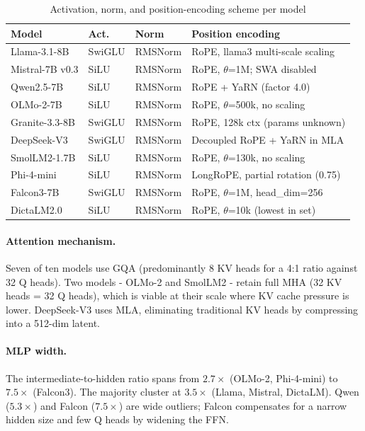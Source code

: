 \documentclass[11pt, a4paper]{article}
\begin{document}
\begin{table}[H]
\centering\small
\caption{Activation, norm, and position-encoding scheme per model}
\label{tab:comparison2}
\begin{tabular}{@{}L{3.0cm}L{1.8cm}L{1.8cm}L{7cm}@{}}
\toprule
\textbf{Model} & \textbf{Act.} & \textbf{Norm} & \textbf{Position encoding} \\
\midrule
Llama-3.1-8B    & SwiGLU & RMSNorm & RoPE, llama3 multi-scale scaling \\
Mistral-7B v0.3 & SiLU   & RMSNorm & RoPE, $\theta$=1M; SWA disabled \\
Qwen2.5-7B      & SiLU   & RMSNorm & RoPE + YaRN (factor 4.0) \\
OLMo-2-7B       & SiLU   & RMSNorm & RoPE, $\theta$=500k, no scaling \\
Granite-3.3-8B  & SwiGLU & RMSNorm & RoPE, 128k ctx (params unknown) \\
DeepSeek-V3     & SwiGLU & RMSNorm & Decoupled RoPE + YaRN in MLA \\
SmolLM2-1.7B    & SiLU   & RMSNorm & RoPE, $\theta$=130k, no scaling \\
Phi-4-mini      & SiLU   & RMSNorm & LongRoPE, partial rotation (0.75) \\
Falcon3-7B      & SwiGLU & RMSNorm & RoPE, $\theta$=1M, head\_dim=256 \\
DictaLM2.0      & SiLU   & RMSNorm & RoPE, $\theta$=10k (lowest in set) \\
\bottomrule
\end{tabular}
\end{table}

\paragraph{Attention mechanism.}
Seven of ten models use GQA (predominantly 8 KV heads for a 4:1 ratio against 32
Q heads).
Two models - OLMo-2 and SmolLM2 - retain full MHA (32 KV heads = 32 Q heads),
which is viable at their scale where KV cache pressure is lower.
DeepSeek-V3 uses MLA, eliminating traditional KV heads by compressing into a
512-dim latent.

\paragraph{MLP width.}
The intermediate-to-hidden ratio spans from $2.7\times$ (OLMo-2, Phi-4-mini)
to $7.5\times$ (Falcon3).
The majority cluster at $3.5\times$ (Llama, Mistral, DictaLM).
Qwen ($5.3\times$) and Falcon ($7.5\times$) are wide outliers;
Falcon compensates for a narrow hidden size and few Q heads by widening the FFN.
\end{document}
